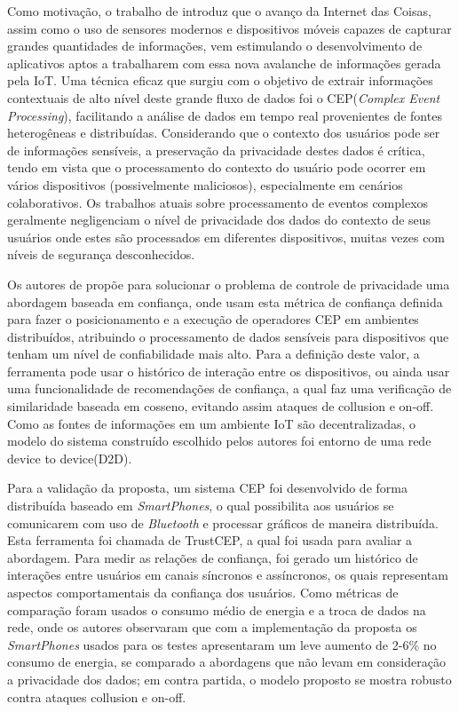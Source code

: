 \documentclass[ti,table]{texufpel} %
\begin{document}
  

    Como motivação, o trabalho de \cite{art6dwarakanath2017trustcep} introduz que o avanço da Internet das Coisas, assim como o uso de sensores modernos e dispositivos móveis capazes de capturar grandes quantidades de informações, vem estimulando o desenvolvimento de aplicativos aptos a trabalharem com essa nova avalanche de informações gerada pela IoT. Uma técnica eficaz que surgiu com o objetivo de extrair informações contextuais de alto nível deste grande fluxo de dados foi o CEP(\textit{Complex Event Processing}), facilitando a análise de dados em tempo real provenientes de fontes heterogêneas e distribuídas. Considerando que o contexto dos usuários pode ser de informações sensíveis, a preservação da privacidade destes dados é crítica, tendo em vista que o processamento do contexto do usuário pode ocorrer em vários dispositivos (possivelmente maliciosos), especialmente em cenários colaborativos. Os trabalhos atuais sobre processamento de eventos complexos geralmente negligenciam o nível de privacidade dos dados do contexto de seus usuários onde estes são processados em diferentes dispositivos, muitas vezes com níveis de segurança desconhecidos.  

     

     

    Os autores de \cite{art6dwarakanath2017trustcep} propõe para solucionar o problema de controle de privacidade uma abordagem baseada em confiança, onde usam esta métrica de confiança definida para fazer o posicionamento e a execução de operadores CEP em ambientes distribuídos, atribuindo o processamento de dados sensíveis para dispositivos que tenham um nível de confiabilidade mais alto. Para a definição deste valor, a ferramenta pode usar o histórico de interação entre os dispositivos, ou ainda usar uma funcionalidade de recomendações de confiança, a qual faz uma verificação de similaridade baseada em cosseno, evitando assim ataques de collusion e on-off. Como as fontes de informações em um ambiente IoT são decentralizadas, o modelo do sistema construído escolhido pelos autores foi entorno de uma rede device to device(D2D). 

     

     

    Para a validação da proposta, um sistema CEP foi desenvolvido de forma distribuída baseado em \textit{SmartPhones}, o qual possibilita aos usuários se comunicarem com uso de \textit{Bluetooth} e processar gráficos de maneira distribuída. Esta ferramenta foi chamada de TrustCEP, a qual foi usada para avaliar a abordagem. Para medir as relações de confiança, foi gerado um histórico de interações entre usuários em canais síncronos e assíncronos, os quais representam aspectos comportamentais da confiança dos usuários. Como métricas de comparação foram usados o consumo médio de energia e a troca de dados na rede, onde os autores observaram que com a implementação da proposta os \textit{SmartPhones} usados para os testes apresentaram um leve aumento de 2-6\% no consumo de energia, se comparado a abordagens que não levam em consideração a privacidade dos dados; em contra partida, o modelo proposto se mostra robusto contra ataques collusion e on-off. 
\end{document}
